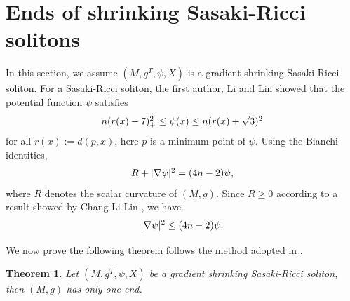 \documentclass[12pt]{amsart}%
\newtheorem{theorem}{Theorem}
\numberwithin{equation}{section}
\begin{document}
\section{Ends of shrinking Sasaki-Ricci solitons}

In this section, we assume $(M,g^{T},\psi,X)$ is a gradient shrinking
Sasaki-Ricci soliton. For a Sasaki-Ricci soliton, the first author, Li and Lin
\cite{cll} showed that the potential function $\psi$ satisfies
\begin{equation}%
\begin{array}
[c]{c}%
n(r(x)-7)_{+}^{2}\leq\psi(x)\leq n(r(x)+\sqrt{3})^{2}%
\end{array}
\label{21}%
\end{equation}
for all $r(x):=d(p,x)$, here $p$ is a minimum point of $\psi$. Using the
Bianchi identities,
\begin{equation}%
\begin{array}
[c]{c}%
R+|\nabla\psi|^{2}=(4n-2)\psi,
\end{array}
\label{21a}%
\end{equation}
where $R$ denotes the scalar curvature of $(M,g)$. Since $R\geq0$ according to
a result showed by Chang-Li-Lin \cite{cll}, we have
\begin{equation}%
\begin{array}
[c]{c}%
|\nabla\psi|^{2}\leq(4n-2)\psi.
\end{array}
\label{22}%
\end{equation}


We now prove the following theorem follows the method adopted in \cite{mw1}.

\begin{theorem}
Let $(M,g^{T},\psi,X)$ be a gradient shrinking Sasaki-Ricci soliton, then
$(M,g)$ has only one end.
\end{theorem}
\end{document}
